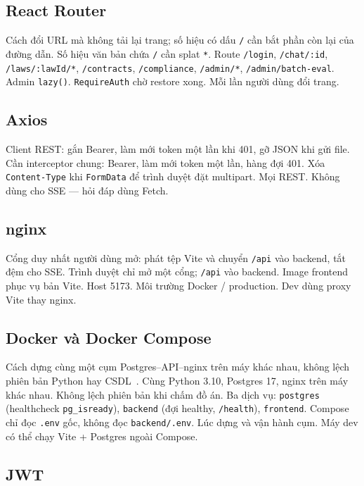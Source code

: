 \subsection{React Router}

\boncau
{Cách đổi URL mà không tải lại trang; số hiệu có dấu \texttt{/} cần bắt phần
còn lại của đường dẫn.}
{Số hiệu văn bản chứa \texttt{/} cần splat \texttt{*}.}
{Route \texttt{/login}, \texttt{/chat/:id}, \texttt{/laws/:lawId/*},
\texttt{/contracts}, \texttt{/compliance}, \texttt{/admin/*},
\texttt{/admin/batch-eval}. Admin \texttt{lazy()}. \texttt{RequireAuth} chờ
restore xong.}
{Mỗi lần người dùng đổi trang.}

\subsection{Axios}

\boncau
{Client REST: gắn Bearer, làm mới token một lần khi 401, gỡ JSON khi gửi file.}
{Cần interceptor chung: Bearer, làm mới token một lần, hàng đợi 401.}
{Xóa \texttt{Content-Type} khi \texttt{FormData} để trình duyệt đặt multipart.}
{Mọi REST. Không dùng cho SSE --- hỏi đáp dùng Fetch.}

\subsection{nginx}

\boncau
{Cổng duy nhất người dùng mở: phát tệp Vite và chuyển \texttt{/api} vào
backend, tắt đệm cho SSE.}
{Trình duyệt chỉ mở một cổng; \texttt{/api} vào backend.}
{Image frontend phục vụ bản Vite. Host 5173.}
{Môi trường Docker / production. Dev dùng proxy Vite thay nginx.}

\subsection{Docker và Docker Compose}

\boncau
{Cách dựng cùng một cụm Postgres--API--nginx trên máy khác nhau, không lệch
phiên bản Python hay CSDL~\cite{docker}.}
{Cùng Python 3.10, Postgres 17, nginx trên máy khác nhau. Không lệch phiên bản
khi chấm đồ án.}
{Ba dịch vụ: \texttt{postgres} (healthcheck \texttt{pg\_isready}),
\texttt{backend} (đợi healthy, \texttt{/health}), \texttt{frontend}. Compose
chỉ đọc \texttt{.env} gốc, không đọc \texttt{backend/.env}.}
{Lúc dựng và vận hành cụm. Máy dev có thể chạy Vite + Postgres ngoài Compose.}

\subsection{JWT}

